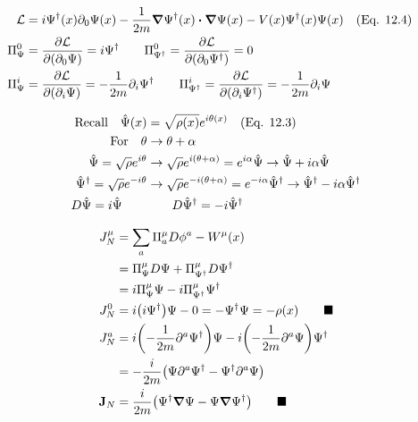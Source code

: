 \documentclass{article}
\begin{document}
\begin{align*}
    \mathcal{L} & =i\Psi^\dagger(x)\partial_0\Psi(x)-\frac{1}{2m}\grad\Psi^\dagger(x)\vdot\grad\Psi(x)-V(x)\Psi^\dagger(x)\Psi(x)\qq{(Eq. 12.4)}                                               \\
    \Pi^0_\Psi  & =\pdv{\mathcal{L}}{(\partial_0 \Psi)}=i\Psi^\dagger\qquad\Pi^0_{\Psi^\dagger}=\pdv{\mathcal{L}}{(\partial_0 \Psi^\dagger)}=0                                                 \\
    \Pi^i_\Psi  & =\pdv{\mathcal{L}}{(\partial_i \Psi)}=-\frac{1}{2m}\partial_i\Psi^\dagger\qquad\Pi^i_{\Psi^\dagger}=\pdv{\mathcal{L}}{(\partial_i \Psi^\dagger)}=-\frac{1}{2m}\partial_i\Psi \\
\end{align*}

\begin{align*}
    \qq*{Recall}\hat{\Psi}(x)                  & =\sqrt{\rho(x)}e^{i\theta(x)}\qq{(Eq. 12.3)}                                                                                      \\
    \qq*{For}\theta                            & \rightarrow\theta+\alpha                                                                                                          \\
    \hat{\Psi}=\sqrt{\rho}e^{i\theta}          & \rightarrow\sqrt{\rho}e^{i(\theta+\alpha)}=e^{i\alpha}\hat{\Psi}\rightarrow\hat{\Psi}+i\alpha\hat{\Psi}                           \\
    \hat{\Psi}^\dagger=\sqrt{\rho}e^{-i\theta} & \rightarrow\sqrt{\rho}e^{-i(\theta+\alpha)}=e^{-i\alpha}\hat{\Psi}^\dagger\rightarrow\hat{\Psi}^\dagger-i\alpha\hat{\Psi}^\dagger \\
    D\hat{\Psi}=i\hat{\Psi}\qquad              & \qquad D\hat{\Psi}^\dagger=-i\hat{\Psi}^\dagger
\end{align*}

\begin{align*}
    J^\mu_N  & = \sum_a \Pi^\mu_a D\phi^a-W^\mu(x)                                                              \\
             & =\Pi^\mu_\Psi D\Psi+\Pi^\mu_{\Psi^\dagger} D\Psi^\dagger                                         \\
             & =i\Pi^\mu_\Psi \Psi-i\Pi^\mu_{\Psi^\dagger} \Psi^\dagger                                         \\
    J^0_N    & =i\pqty{i\Psi^\dagger}\Psi-0=-\Psi^\dagger \Psi=-\rho(x)\qquad\blacksquare                       \\
    J^a_N    & =i\pqty{-\frac{1}{2m}\partial^a\Psi^\dagger}\Psi-i\pqty{-\frac{1}{2m}\partial^a\Psi}\Psi^\dagger \\
             & =-\frac{i}{2m}\pqty{\Psi\partial^a\Psi^\dagger-\Psi^\dagger\partial^a\Psi}                       \\
    \vb{J}_N & =\frac{i}{2m}\pqty{\Psi^\dagger\grad\Psi-\Psi\grad\Psi^\dagger}\qquad\blacksquare                \\
\end{align*}
\end{document}
